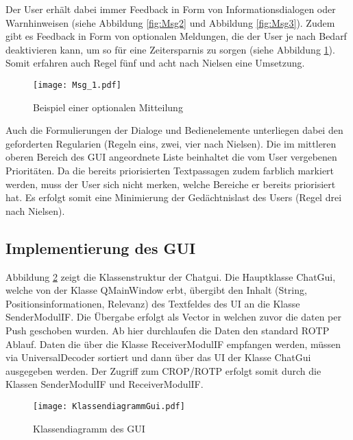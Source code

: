 Der User erh{\"a}lt dabei immer Feedback in Form von
Informationsdialogen oder Warnhinweisen (siehe Abbildung \ref{fig:Msg2} und
Abbildung
\ref{fig:Msg3}). Zudem gibt es Feedback in Form von optionalen Meldungen, die
der User je nach Bedarf deaktivieren kann, um so f{\"u}r eine Zeitersparnis zu
sorgen (siehe Abbildung \ref{fig:Msg1}). Somit erfahren auch Regel f{\"u}nf und
acht nach Nielsen eine Umsetzung.

\begin{figure}[H]
	\centering
	\texttt{[image: Msg\_1.pdf]}
	\caption{Beispiel einer optionalen Mitteilung}
	\label{fig:Msg1}
\end{figure}

Auch die Formulierungen der Dialoge und Bedienelemente unterliegen dabei den
geforderten Regularien (Regeln eins, zwei, vier nach Nielsen). Die im mittleren
oberen Bereich des \gls{GUI} angeordnete Liste beinhaltet die vom User
vergebenen Priorit{\"a}ten. Da die bereits priorisierten Textpassagen zudem farblich
markiert werden, muss der User sich nicht merken, welche Bereiche er bereits
priorisiert hat. Es erfolgt somit eine Minimierung der Ged{\"a}chtnislast des
Users (Regel drei nach Nielsen).

\subsection{Implementierung des GUI}

Abbildung \ref{fig:KlassendiagrammGui} zeigt die Klassenstruktur der Chatgui.
Die Hauptklasse ChatGui, welche von der Klasse QMainWindow erbt, {\"u}bergibt
den Inhalt (String, Positionsinformationen, Relevanz) des Textfeldes des UI an
die Klasse SenderModulIF.
Die {\"U}bergabe erfolgt als Vector in welchen zuvor die daten per Push geschoben wurden. Ab hier
durchlaufen die Daten den standard ROTP Ablauf. Daten die {\"u}ber
die Klasse ReceiverModulIF empfangen werden, m{\"u}ssen via UniversalDecoder
sortiert und dann {\"u}ber das UI der Klasse ChatGui ausgegeben werden. Der
Zugriff zum CROP/ROTP erfolgt somit durch die Klassen SenderModulIF und
ReceiverModulIF.

\begin{figure}[H]
	\centering
	\texttt{[image: KlassendiagrammGui.pdf]}
	\caption{Klassendiagramm des GUI}
	\label{fig:KlassendiagrammGui}
\end{figure}